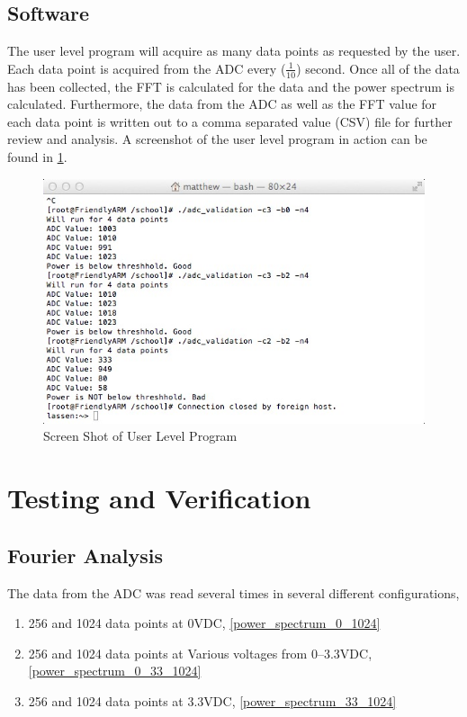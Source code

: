 \documentclass[10pt,conference]{IEEEtran}
\begin{document}
\subsection{Software}
The user level program will acquire as many data points as requested by the user. Each data point is acquired from the ADC every ($\frac{1}{10}$) second. Once all of the data has been collected, the FFT is calculated for the data and the power spectrum is calculated. Furthermore, the data from the ADC as well as the FFT value for each data point is written out to a comma separated value (CSV) file for further review and analysis. 
A screenshot of the user level program in action can be found in \ref{lab2inaction}.

\begin{figure}[ht!]
	\includegraphics[scale=.55]{lab2inaction.jpg}
	\caption{Screen Shot of User Level Program}\label{lab2inaction}
\end{figure}


%
%
\section{Testing and Verification}
\subsection{Fourier Analysis}
The data from the ADC was read several times in several different configurations,
\begin{enumerate}
	\item 256 and 1024 data points at 0VDC, \ref{power_spectrum_0_1024}
	\item 256 and 1024 data points at Various voltages from 0--3.3VDC, \ref{power_spectrum_0_33_1024}
	\item 256 and 1024 data points at 3.3VDC, \ref{power_spectrum_33_1024}
\end{enumerate}
\end{document}
